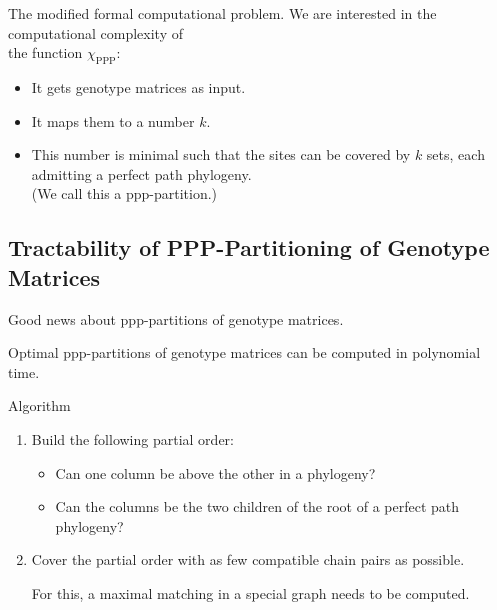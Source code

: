 \documentclass[aspectratio=1610]{beamer}
\begin{document}
\begin{frame}{The modified formal computational problem.}
  We are interested in the computational complexity of \\
  the function $\chi_{{\operatorname{PPP}}}$:
  \begin{itemize}
  \item It gets genotype matrices as input.
  \item It maps them to a number $k$.
  \item This number is minimal such that the sites can be
    covered by $k$ sets, each admitting a perfect \alert{path} phylogeny.
    \\
    (We call this a ppp-partition.)
  \end{itemize}
\end{frame}



\subsection{Tractability of PPP-Partitioning of Genotype Matrices}

\begin{frame}{Good news about ppp-partitions of genotype matrices.}
  \begin{theorem}
    \alert{Optimal ppp-partitions of genotype matrices} can be
    computed in \alert{polynomial time}. 
  \end{theorem}
  \begin{block}{Algorithm}
    \begin{enumerate}
    \item Build the following partial order:
      \begin{itemize}
      \item Can one column be above the other in a phylogeny?
      \item Can the columns be the two children of the root of a
        perfect path phylogeny?
      \end{itemize}
    \item Cover the partial order with as few compatible chain pairs 
      as possible. 

      For this, a maximal matching in a special graph needs to be
      computed.
    \end{enumerate}
  \end{block}
  \hyperlink{algorithm<1>}{}
  \hypertarget{return}{}
\end{frame}
\end{document}
